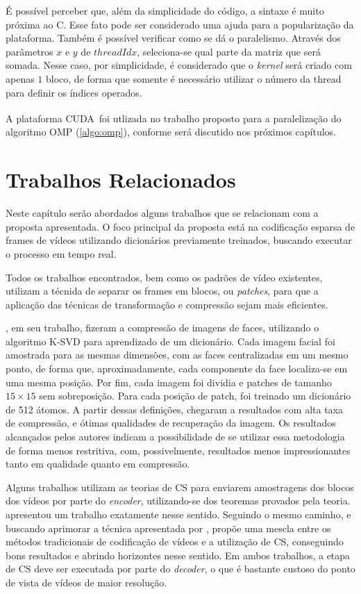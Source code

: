 \documentclass[cic,tc]{iiufrgs}
\newcommand{\reg}{\textsuperscript{\textregistered}}
\begin{document}
É possível perceber que, além da simplicidade do código, a sintaxe é muito próxima ao C. 
Esse fato pode ser considerado uma ajuda para a popularização da plataforma.
Também é possível verificar como se dá o paralelismo. 
Através dos parâmetros $x$ e $y$ de $threadIdx$, seleciona-se qual parte da matriz que 
será somada. 
Nesse caso, por simplicidade, é considerado que o \textit{kernel} será criado com apenas
$1$ bloco, de forma que somente é necessário utilizar o número da thread para definir 
os índices operados.

A plataforma CUDA\reg~foi utlizada no trabalho proposto para a paralelização do algoritmo
OMP (\autoref{algo:omp}), conforme será discutido nos próximos capítulos.


\chapter{Trabalhos Relacionados}
Neste capítulo serão abordados alguns trabalhos que se relacionam com a proposta apresentada.
O foco principal da proposta está na codificação esparsa de frames de vídeos utilizando dicionários
previamente treinados, buscando executar o processo em tempo real.

Todos os trabalhos encontrados, bem como os padrões de vídeo existentes,
utilizam a técnida de separar os frames em blocos, ou \textit{patches},
para que a aplicação das técnicas de transformação e compressão sejam 
mais eficientes.

\citet{BRYTFACEKSVD}, em seu trabalho, fizeram a compressão de imagens de faces, 
utilizando o algoritmo K-SVD para aprendizado de um dicionário. 
Cada imagem facial foi amostrada para as mesmas dimensões, com as faces centralizadas
em um mesmo ponto, de forma que, aproximadamente, cada componente da face localiza-se
em uma mesma posição.
Por fim, cada imagem foi dividia e patches de tamanho $15\times 15$ sem sobreposição.
Para cada posição de patch, foi treinado um dicionário
de 512 átomos. A partir dessas definições, \citet{BRYTFACEKSVD} chegaram a resultados 
com alta taxa de compressão, e ótimas qualidades de recuperação da imagem.
Os resultados alcançados pelos autores indicam a possibilidade de se utilizar essa
metodologia de forma menos restritiva, com, possivelmente, resultados menos impressionantes
tanto em qualidade quanto em compressão.

Alguns trabalhos utilizam as teorias de CS para enviarem amostragens dos blocos
dos vídeos por parte do \textit{encoder}, utilizando-se dos teoremas provados pela teoria.
\citet{NebotDVC} apresentou um trabalho exatamente nesse sentido.
Seguindo o mesmo caminho, e buscando aprimorar a técnica apresentada por \citeauthor{NebotDVC}, 
\citet{DoDISCOS} propõe uma mescla entre os métodos tradicionais de codificação de vídeos
e a utilização de CS, conseguindo bons resultados e abrindo horizontes nesse sentido.
Em ambos trabalhos, a etapa de CS deve ser executada por parte do \textit{decoder}, 
o que é bastante custoso do ponto de vista de vídeos de maior resolução.
\end{document}
